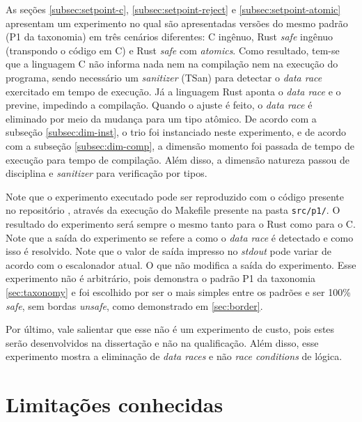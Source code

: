 As seções \ref{subsec:setpoint-c}, \ref{subsec:setpoint-reject} e \ref{subsec:setpoint-atomic} apresentam um experimento no qual são apresentadas versões do mesmo padrão (P1 da taxonomia) em três cenários diferentes: C ingênuo, Rust \textit{safe} ingênuo (transpondo o código em C) e Rust \textit{safe} com \textit{atomics}. Como resultado, tem-se que a linguagem C não informa nada nem na compilação nem na execução do programa, sendo necessário um \textit{sanitizer} (\ac{TSan}) para detectar o \textit{data race} exercitado em tempo de execução. Já a linguagem Rust aponta o \textit{data race} e o previne, impedindo a compilação. Quando o ajuste é feito, o \textit{data race} é eliminado por meio da mudança para um tipo atômico. De acordo com a subseção \ref{subsec:dim-inst}, o trio foi instanciado neste experimento, e de acordo com a subseção \ref{subsec:dim-comp}, a dimensão momento foi passada de tempo de execução para tempo de compilação. Além disso, a dimensão natureza passou de disciplina e \textit{sanitizer} para verificação por tipos.

Note que o experimento executado pode ser reproduzido com o código presente no repositório \citep{quals-repo}, através da execução do Makefile presente na pasta \texttt{src/p1/}. O resultado do experimento será sempre o mesmo tanto para o Rust como para o C. Note que a saída do experimento se refere a como o \textit{data race} é detectado e como isso é resolvido. Note que o valor de saída impresso no \textit{stdout} pode variar de acordo com o escalonador atual. O que não modifica a saída do experimento. Esse experimento não é arbitrário, pois demonstra o padrão P1 da taxonomia \ref{sec:taxonomy} e foi escolhido por ser o mais simples entre os padrões e ser 100\% \textit{safe}, sem bordas \textit{unsafe}, como demonstrado em \ref{sec:border}.

Por último, vale salientar que esse não é um experimento de custo, pois estes serão desenvolvidos na dissertação e não na qualificação. Além disso, esse experimento mostra a eliminação de \textit{data races} e não \textit{race conditions} de lógica.

\section{Limitações conhecidas}
\label{sec:partial-limitations}


